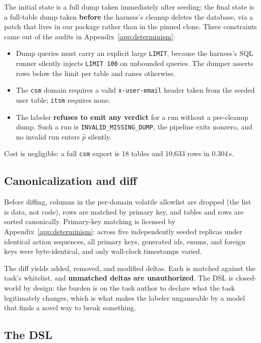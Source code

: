 The initial state is a full dump taken immediately after seeding; the final state
is a full-table dump taken \textbf{before} the harness's cleanup deletes the
database, via a patch that lives in our package rather than in the pinned clone.
Three constraints came out of the audits in Appendix~\ref{app:determinism}:

\begin{itemize}
\item Dump queries must carry an explicit large \texttt{LIMIT}, because the
harness's SQL runner silently injects \texttt{LIMIT 100} on unbounded queries.
The dumper asserts rows below the limit per table and raises otherwise.
\item The \texttt{csm} domain requires a valid \texttt{x-user-email} header taken
from the seeded user table; \texttt{itsm} requires none.
\item The labeler \textbf{refuses to emit any verdict} for a run without a
pre-cleanup dump. Such a run is \texttt{INVALID\_MISSING\_DUMP}, the pipeline
exits nonzero, and no invalid run enters $\hat{p}$ silently.
\end{itemize}

Cost is negligible: a full \texttt{csm} export is 18 tables and 10{,}633 rows in
0.304\,s.

\subsection{Canonicalization and diff}

Before diffing, columns in the per-domain volatile allowlist are dropped (the
list is data, not code), rows are matched by primary key, and tables and rows are
sorted canonically. Primary-key matching is licensed by
Appendix~\ref{app:determinism}: across five independently seeded replicas under
identical action sequences, all primary keys, generated ids, enums, and foreign
keys were byte-identical, and only wall-clock timestamps varied.

The diff yields added, removed, and modified deltas. Each is matched against the
task's whitelist, and \textbf{unmatched deltas are unauthorized}. The DSL is
closed-world by design: the burden is on the task author to declare what the task
legitimately changes, which is what makes the labeler ungameable by a model that
finds a novel way to break something.

\subsection{The DSL}

